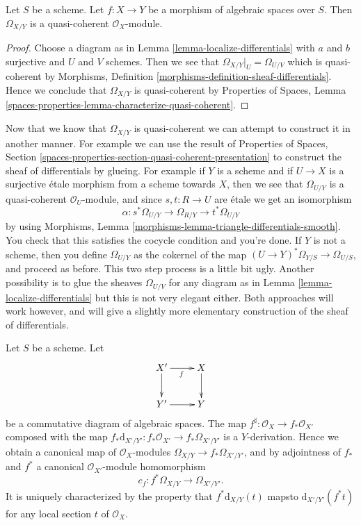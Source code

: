 \begin{lemma}
\label{lemma-module-differentials-quasi-coherent}
Let $S$ be a scheme. Let $f : X \to Y$ be a morphism of algebraic spaces
over $S$. Then $\Omega_{X/Y}$ is a quasi-coherent $\mathcal{O}_X$-module.
\end{lemma}

\begin{proof}
Choose a diagram as in
Lemma \ref{lemma-localize-differentials}
with $a$ and $b$ surjective and $U$ and $V$ schemes.
Then we see that $\Omega_{X/Y}|_U = \Omega_{U/V}$ which is
quasi-coherent by
Morphisms, Definition \ref{morphisms-definition-sheaf-differentials}.
Hence we conclude that $\Omega_{X/Y}$ is quasi-coherent by
Properties of Spaces,
Lemma \ref{spaces-properties-lemma-characterize-quasi-coherent}.
\end{proof}

\begin{remark}
\label{remark-alternative}
Now that we know that $\Omega_{X/Y}$ is quasi-coherent we can attempt
to construct it in another manner. For example we can use the result of
Properties of Spaces,
Section \ref{spaces-properties-section-quasi-coherent-presentation}
to construct the sheaf of differentials by glueing.
For example if $Y$ is a scheme and if $U \to X$ is a surjective \'etale morphism
from a scheme towards $X$, then we see that $\Omega_{U/Y}$ is
a quasi-coherent $\mathcal{O}_U$-module, and since $s, t : R \to U$
are \'etale we get an isomorphism
$$
\alpha : s^*\Omega_{U/Y} \to \Omega_{R/Y} \to t^*\Omega_{U/Y}
$$
by using
Morphisms, Lemma \ref{morphisms-lemma-triangle-differentials-smooth}.
You check that this satisfies the cocycle condition and you're done.
If $Y$ is not a scheme, then you define $\Omega_{U/Y}$ as the cokernel
of the map $(U \to Y)^*\Omega_{Y/S} \to \Omega_{U/S}$, and proceed as
before. This two step process is a little bit ugly. Another possibility
is to glue the sheaves $\Omega_{U/V}$ for any diagram as in
Lemma \ref{lemma-localize-differentials}
but this is not very elegant either. Both approaches will work however, and
will give a slightly more elementary construction of the sheaf of
differentials.
\end{remark}


\begin{lemma}
\label{lemma-functoriality-differentials}
Let $S$ be a scheme. Let
$$
\xymatrix{
X' \ar[d] \ar[r]_f & X \ar[d] \\
Y' \ar[r] & Y
}
$$
be a commutative diagram of algebraic spaces. The map
$f^\sharp : \mathcal{O}_X \to f_*\mathcal{O}_{X'}$ composed with the map
$f_*\text{d}_{X'/Y'} : f_*\mathcal{O}_{X'} \to f_*\Omega_{X'/Y'}$ is a
$Y$-derivation. Hence we obtain a canonical map of $\mathcal{O}_X$-modules
$\Omega_{X/Y} \to f_*\Omega_{X'/Y'}$, and by
adjointness of $f_*$ and $f^*$ a
canonical $\mathcal{O}_{X'}$-module homomorphism
$$
c_f : f^*\Omega_{X/Y} \longrightarrow \Omega_{X'/Y'}.
$$
It is uniquely characterized by the property that
$f^*\text{d}_{X/Y}(t)$ mapsto $\text{d}_{X'/Y'}(f^* t)$
for any local section $t$ of $\mathcal{O}_X$.
\end{lemma}

